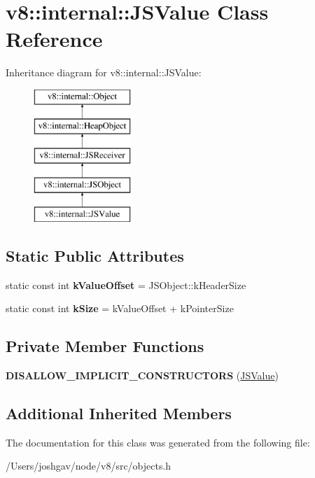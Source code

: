 \hypertarget{classv8_1_1internal_1_1_j_s_value}{}\section{v8\+:\+:internal\+:\+:J\+S\+Value Class Reference}
\label{classv8_1_1internal_1_1_j_s_value}
Inheritance diagram for v8\+:\+:internal\+:\+:J\+S\+Value\+:\begin{figure}[H]
\begin{center}
\leavevmode
\includegraphics[height=5.000000cm]{classv8_1_1internal_1_1_j_s_value}
\end{center}
\end{figure}
\subsection*{Static Public Attributes}
\begin{DoxyCompactItemize}
\item 
static const int {\bfseries k\+Value\+Offset} = J\+S\+Object\+::k\+Header\+Size\hypertarget{classv8_1_1internal_1_1_j_s_value_a2d01c7fffbb992f02238702dff7d5b8f}{}\label{classv8_1_1internal_1_1_j_s_value_a2d01c7fffbb992f02238702dff7d5b8f}

\item 
static const int {\bfseries k\+Size} = k\+Value\+Offset + k\+Pointer\+Size\hypertarget{classv8_1_1internal_1_1_j_s_value_a8f0fedf075454bcd7cb54bd598ffde91}{}\label{classv8_1_1internal_1_1_j_s_value_a8f0fedf075454bcd7cb54bd598ffde91}

\end{DoxyCompactItemize}
\subsection*{Private Member Functions}
\begin{DoxyCompactItemize}
\item 
{\bfseries D\+I\+S\+A\+L\+L\+O\+W\+\_\+\+I\+M\+P\+L\+I\+C\+I\+T\+\_\+\+C\+O\+N\+S\+T\+R\+U\+C\+T\+O\+RS} (\hyperlink{classv8_1_1internal_1_1_j_s_value}{J\+S\+Value})\hypertarget{classv8_1_1internal_1_1_j_s_value_a6391ea17c00fd3383fd60ac5cc5ff021}{}\label{classv8_1_1internal_1_1_j_s_value_a6391ea17c00fd3383fd60ac5cc5ff021}

\end{DoxyCompactItemize}
\subsection*{Additional Inherited Members}


The documentation for this class was generated from the following file\+:\begin{DoxyCompactItemize}
\item 
/\+Users/joshgav/node/v8/src/objects.\+h\end{DoxyCompactItemize}
